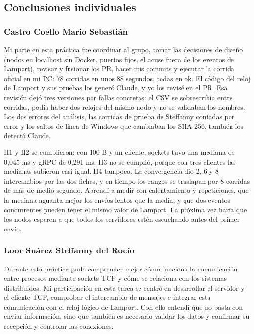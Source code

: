 \subsection{Conclusiones individuales}


\subsubsection*{Castro Coello Mario Sebastián}
Mi parte en esta práctica fue coordinar al grupo, tomar las decisiones de diseño (nodos en localhost sin Docker, puertos fijos, el acuse fuera de los eventos de Lamport), revisar y fusionar los PR, hacer mis commits y ejecutar la corrida oficial en mi PC: 78 corridas en unos 88 segundos, todas en ok. El código del reloj de Lamport y sus pruebas los generó Claude, y yo los revisé en el PR. Esa revisión dejó tres versiones por fallas concretas: el CSV se sobrescribía entre corridas, podía haber dos relojes del mismo nodo y no se validaban los nombres. Los dos errores del análisis, las corridas de prueba de Steffanny contadas por error y los saltos de línea de Windows que cambiaban los SHA-256, también los detectó Claude.

H1 y H2 se cumplieron: con 100 B y un cliente, sockets tuvo una mediana de 0,045 ms y gRPC de 0,291 ms. H3 no se cumplió, porque con tres clientes las medianas subieron casi igual. H4 tampoco. La convergencia dio 2, 6 y 8 intercambios por las dos fichas, y en tiempo los rangos se traslapan por 8 corridas de más de medio segundo. Aprendí a medir con calentamiento y repeticiones, que la mediana aguanta mejor los envíos lentos que la media, y que dos eventos concurrentes pueden tener el mismo valor de Lamport. La próxima vez haría que los nodos esperen a que todos los servidores estén escuchando antes del primer envío.

\subsubsection*{Loor Suárez Steffanny del Rocío}
Durante esta práctica pude comprender mejor cómo funciona la
comunicación entre procesos mediante sockets TCP y cómo
se relaciona con los sistemas distribuidos.
Mi participación en esta tarea se centró en desarrollar el servidor y
el cliente TCP, comprobar el intercambio de mensajes e
integrar esta comunicación con el reloj lógico de Lamport.
Con ello entendí que no basta con enviar información,
sino que también es necesario validar los datos y confirmar su
recepción y controlar las conexiones.

